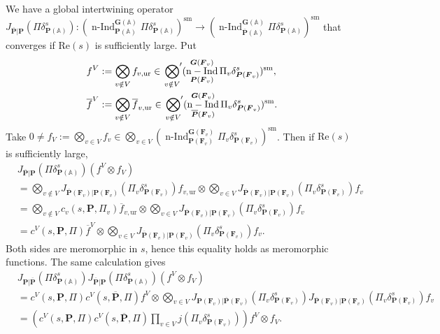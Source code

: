 \documentclass[a4paper]{amsart}
\numberwithin{equation}{section}
\theoremstyle{remark}
\theoremstyle{definition}
\DeclareMathOperator{\nInd}{n-Ind}
\newcommand{\sm}{\mathrm{sm}}
\newcommand{\unram}{\mathrm{ur}}
\newcommand{\glob}[1]{\boldsymbol{#1}}
\begin{document}
We have a global intertwining operator $J_{\overline{\glob{P}}|\glob{P}}(\Pi\delta_{\glob{P}(\mathbb{A})}^{s})\colon (\nInd_{\glob{P}(\mathbb{A})}^{\glob{G}(\mathbb{A})}\Pi\delta_{\glob{P}(\mathbb{A})}^{s})^{\sm}\to (\nInd_{\overline{\glob{P}}(\mathbb{A})}^{\glob{G}(\mathbb{A})}\Pi\delta_{\glob{P}(\mathbb{A})}^{s})^{\sm}$ that converges if $\mathrm{Re}(s)$ is sufficiently large.
Put
\begin{align*}
f^{V} &:= \bigotimes_{v\notin V}f_{v,\unram}\in \sideset{}{'}\bigotimes_{v\notin V}(\nInd_{\glob{P}(\glob{F}_{v})}^{\glob{G}(\glob{F}_{v})}\Pi_{v}\delta_{\glob{P}(\glob{F}_{v})}^{s})^{\sm}, \\
\overline{f}^{V} &:= \bigotimes_{v\notin V}\overline{f}_{v,\unram}\in \sideset{}{'}\bigotimes_{v\notin V}(\nInd_{\overline{\glob{P}}(\glob{F}_{v})}^{\glob{G}(\glob{F}_{v})}\Pi_{v}\delta_{\glob{P}(\glob{F}_{v})}^{s})^{\sm}.
\end{align*}
Take $0\ne f_{V} := \bigotimes_{v\in V}f_{v}\in \bigotimes_{v\in V}(\nInd_{\glob{P}(\glob{F}_{v})}^{\glob{G}(\glob{F}_{v})}\Pi_{v}\delta_{\glob{P}(\glob{F}_{v})}^{s})^{\sm}$.
Then if $\mathrm{Re}(s)$ is sufficiently large,
\begin{align*}
&J_{\overline{\glob{P}}|\glob{P}}(\Pi\delta_{\glob{P}(\mathbb{A})}^{s})(f^{V}\otimes f_{V})\\
& = \bigotimes_{v\notin V} J_{\overline{\glob{P}}(\glob{F}_{v})|\glob{P}(\glob{F}_{v})}(\Pi_{v}\delta_{\glob{P}(\glob{F}_{v})}^{s})f_{v,\unram}\otimes\bigotimes_{v\in V}J_{\overline{\glob{P}}(\glob{F}_{v})|\glob{P}(\glob{F}_{v})}(\Pi_{v}\delta_{\glob{P}(\glob{F}_{v})}^{s})f_{v}\\
& = \bigotimes_{v\notin V}c_{v}(s,\glob{P},\Pi_{v})\overline{f}_{v,\unram}\otimes \bigotimes_{v\in V}J_{\overline{\glob{P}}(\glob{F}_{v})|\glob{P}(\glob{F}_{v})}(\Pi_{v}\delta_{\glob{P}(\glob{F}_{v})}^{s})f_{v}\\
& = c^{V}(s,\glob{P},\Pi)\overline{f}^{V}\otimes\bigotimes_{v\in V}J_{\overline{\glob{P}}(\glob{F}_{v})|\glob{P}(\glob{F}_{v})}(\Pi_{v}\delta_{\glob{P}(\glob{F}_{v})}^{s})f_{v}.
\end{align*}
Both sides are meromorphic in $s$, hence this equality holds as meromorphic functions.
The same calculation gives
\begin{align*}
& J_{\glob{P}|\overline{\glob{P}}}(\Pi\delta_{\glob{P}(\mathbb{A})}^{s})J_{\overline{\glob{P}}|\glob{P}}(\Pi\delta_{\glob{P}(\mathbb{A})}^{s})(f^{V}\otimes f_{V})\\
& =
c^{V}(s,\glob{P},\Pi)c^{V}(s,\overline{\glob{P}},\Pi)f^{V}\otimes\bigotimes_{v\in V}J_{\glob{P}(\glob{F}_{v})|\overline{\glob{P}}(\glob{F}_{v})}(\Pi_{v}\delta_{\glob{P}(\glob{F}_{v})}^{s})J_{\overline{\glob{P}}(\glob{F}_{v})|\glob{P}(\glob{F}_{v})}(\Pi_{v}\delta_{\glob{P}(\glob{F}_{v})}^{s})f_{v}\\
& = \left(c^{V}(s,\glob{P},\Pi)c^{V}(s,\overline{\glob{P}},\Pi)\prod_{v\in V}j(\Pi_{v}\delta_{\glob{P}(\glob{F}_{v})}^{s})\right)f^{V}\otimes f_{V}.
\end{align*}
\end{document}
